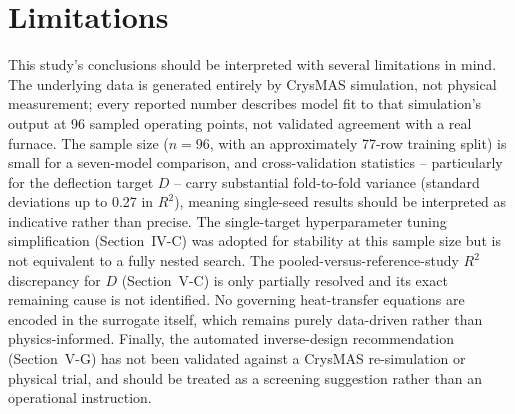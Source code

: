 \documentclass[conference]{IEEEtran}
\begin{document}
\section{Limitations}
This study's conclusions should be interpreted with several limitations in mind. The underlying data is generated entirely by CrysMAS simulation, not physical measurement; every reported number describes model fit to that simulation's output at 96 sampled operating points, not validated agreement with a real furnace. The sample size ($n=96$, with an approximately 77-row training split) is small for a seven-model comparison, and cross-validation statistics -- particularly for the deflection target $D$ -- carry substantial fold-to-fold variance (standard deviations up to 0.27 in $R^2$), meaning single-seed results should be interpreted as indicative rather than precise. The single-target hyperparameter tuning simplification (Section~IV-C) was adopted for stability at this sample size but is not equivalent to a fully nested search. The pooled-versus-reference-study $R^2$ discrepancy for $D$ (Section~V-C) is only partially resolved and its exact remaining cause is not identified. No governing heat-transfer equations are encoded in the surrogate itself, which remains purely data-driven rather than physics-informed. Finally, the automated inverse-design recommendation (Section~V-G) has not been validated against a CrysMAS re-simulation or physical trial, and should be treated as a screening suggestion rather than an operational instruction.

\end{document}
